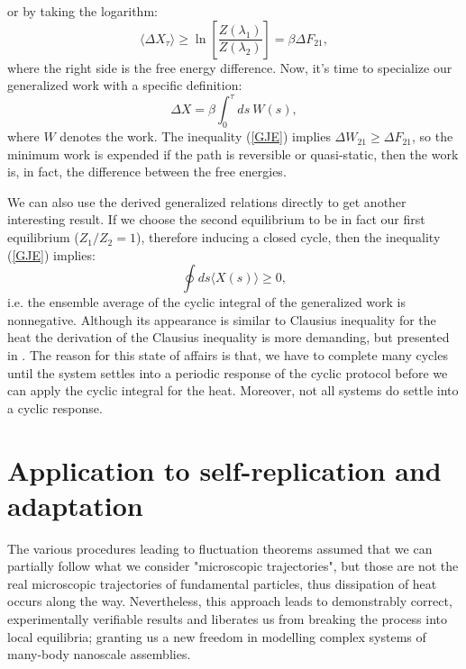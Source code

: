 \documentclass[a4paper,12pt]{article}
\begin{document}
or by taking the logarithm:
\begin{equation}
\label{GJE}
  \langle \Delta X_\tau \rangle \geq \ln\left[\frac{Z(\lambda_1)}{Z(\lambda_2)}\right]=\beta \Delta F_{21},
\end{equation}
where the right side is the free energy difference. Now, it's time to specialize our generalized work with a specific definition:
\begin{equation}
  \Delta X = \beta \int_0^\tau ds\ W(s),
\end{equation}
where $W$ denotes the work. The inequality (\ref{GJE}) implies $\Delta W_{21} \geq \Delta F_{21} $, so the minimum work is expended if the path is reversible or quasi-static, then the work is, in fact, the difference between the free energies.%

We can also use the derived generalized relations directly to get another interesting result. 
If we choose the second equilibrium to be in fact our first equilibrium ($Z_1/Z_2=1$), therefore inducing a closed cycle, then the inequality (\ref{GJE}) implies:
\begin{equation}
\label{CyclicInequalityForGeneralizedWork}
  \oint ds \langle X(s) \rangle \geq 0,
\end{equation}
i.e. the ensemble average of the cyclic integral of the generalized work is nonnegative.
Although its appearance is similar to Clausius inequality for the heat the derivation of the Clausius inequality is more demanding, but presented in \cite{Evans:2241458}.
The reason for this state of affairs is that, we have to complete many cycles until the system settles into a periodic response of the cyclic protocol before we can apply the cyclic integral for the heat. Moreover, not all systems do settle into a cyclic response.

\section{Application to self-replication and adaptation}
\label{CrooksApplications}

The various procedures leading to fluctuation theorems assumed that we can partially follow what we consider "microscopic trajectories", but those are not the real microscopic trajectories of fundamental particles, thus dissipation of heat occurs along the way. Nevertheless, this approach leads to demonstrably correct, experimentally verifiable results and liberates us from breaking the process into local equilibria; granting us a new freedom in modelling complex systems of many-body nanoscale assemblies.
\end{document}

